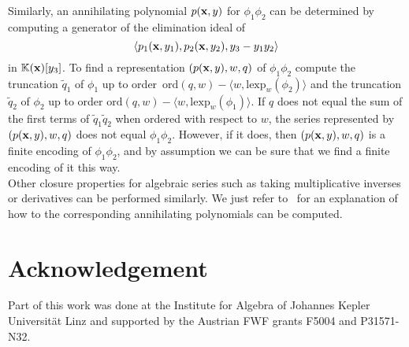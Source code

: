 \documentclass[a4paper,draft]{amsart}
\theoremstyle{definition}
\begin{document}
Similarly, an annihilating polynomial $p(\bold{x},y)$ for $\phi_1\phi_2$ can be determined by computing a generator of the elimination ideal of 
\begin{equation*}
\langle p_1(\bold{x},y_1),p_2(\bold{x},y_2), y_3 - y_1y_2\rangle 
\end{equation*}
in $\mathbb{K}(\bold{x})[y_3]$. To find a representation $(p(\bold{x},y),w,q)$ of $\phi_1\phi_2$ 
compute the truncation $\tilde{q}_1$ of $\phi_1$ up to order~$\mathrm{ord}(q,w) - \langle w, \mathrm{lexp}_w(\phi_2)\rangle$ and the truncation $\tilde{q}_2$ of $\phi_2$ up to order $\mathrm{ord}(q,w) - \langle w, \mathrm{lexp}_w(\phi_1)\rangle$. If $q$ does not equal the sum of the first terms of $\tilde{q}_1 \tilde{q}_2$ when ordered with respect to $w$, the series represented by~$(p(\bold{x},y),w,q)$ does not equal $\phi_1\phi_2$. However, if it does, then $(p(\bold{x},y),w,q)$ is a finite encoding of $\phi_1 \phi_2$, and by assumption we can be sure that we find a finite encoding of it this way.\\

Other closure properties for algebraic series such as taking multiplicative inverses or derivatives can be performed similarly. We just refer to~\cite[Theorem 6.3]{kauers2011concrete} for an explanation of how to the corresponding annihilating polynomials can be computed.

\section*{Acknowledgement}
Part of this work was done at the Institute for Algebra of Johannes Kepler Universit\"{a}t Linz and supported by the Austrian FWF grants F5004 and P31571-N32.




\end{document}
